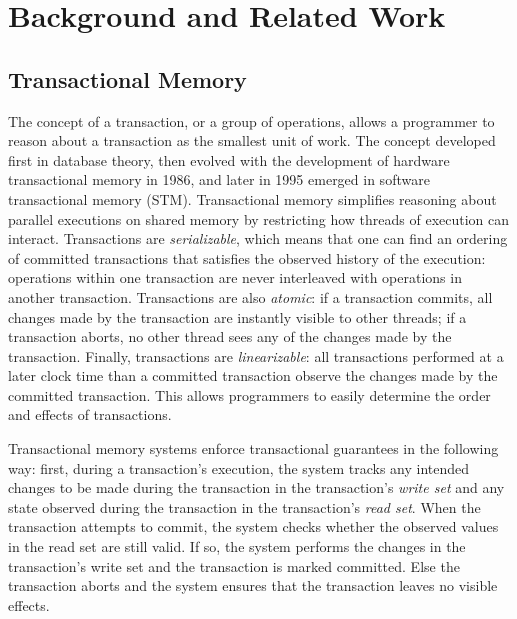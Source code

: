 \section{Background and Related Work}

\subsection{Transactional Memory}
The concept of a transaction, or a group of operations, allows a programmer to reason about a transaction as the smallest unit of work. The concept developed first in database theory, then evolved with the development of hardware transactional memory in 1986, and later in 1995 emerged in software transactional memory (STM). Transactional memory\cite{harristm}\cite{herlihytm} simplifies reasoning about parallel executions on shared memory by restricting how threads of execution can interact. Transactions are \emph{serializable}, which means that one can find an ordering of committed transactions that satisfies the observed history of the execution: operations within one transaction are never interleaved with operations in another transaction. Transactions are also \emph{atomic}: if a transaction commits, all changes made by the transaction are instantly visible to other threads; if a transaction aborts, no other thread sees any of the changes made by the transaction. Finally, transactions are \emph{linearizable}\cite{linearizability}: all transactions performed at a later clock time than a committed transaction observe the changes made by the committed transaction. This allows programmers to easily determine the order and effects of transactions.

Transactional memory systems enforce transactional guarantees in the following way: first, during a transaction's execution, the system tracks any intended changes to be made during the transaction in the transaction's \emph{write set} and any state observed during the transaction in the transaction's \emph{read set}. When the transaction attempts to commit, the system checks whether the observed values in the read set are still valid. If so, the system performs the changes in the transaction's write set and the transaction is marked committed. Else the transaction aborts and the system ensures that the transaction leaves no visible effects.

